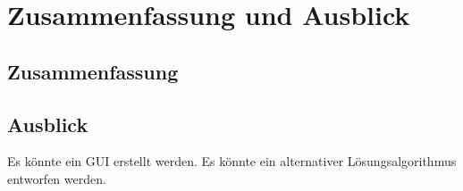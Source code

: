 \chapter{Zusammenfassung und Ausblick}\label{ch:zusammenfassung-und-ausblick}


\section{Zusammenfassung}\label{sec:zusammenfassung}

\section{Ausblick}\label{sec:ausblick}
Es könnte ein GUI erstellt werden.
Es könnte ein alternativer Lösungsalgorithmus entworfen werden.
